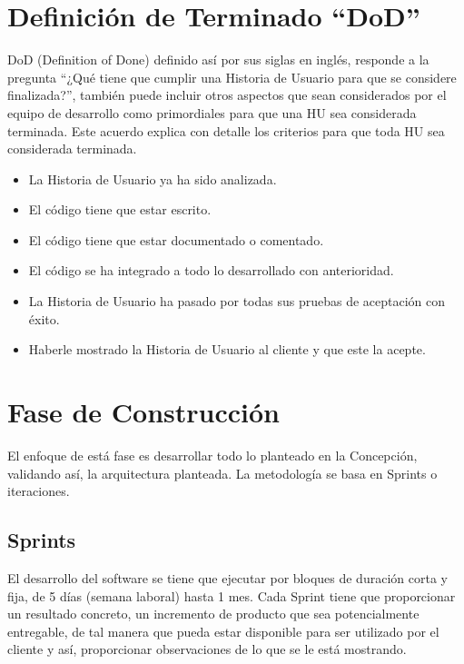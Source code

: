 \section*{Definición de Terminado “DoD”}

DoD (Definition of Done) definido así por sus siglas en inglés, responde a la pregunta “¿Qué tiene que cumplir una Historia de Usuario para que se considere finalizada?”, también puede incluir otros aspectos que sean considerados por el equipo de desarrollo como primordiales para que una HU sea considerada terminada. Este acuerdo explica con detalle los criterios para que toda HU sea considerada terminada.

\begin{itemize}
    \item La Historia de Usuario ya ha sido analizada.
    \item El código tiene que estar escrito.
    \item El código tiene que estar documentado o comentado.
    \item El código se ha integrado a todo lo desarrollado con anterioridad.
    \item La Historia de Usuario ha pasado por todas sus pruebas de aceptación con éxito.
    \item Haberle mostrado la Historia de Usuario al cliente y que este la acepte.
\end{itemize}


\section*{Fase de Construcción}

El enfoque de está fase es desarrollar todo lo planteado en la Concepción, validando así, la arquitectura planteada. La metodología se basa en Sprints o iteraciones.

\subsection*{Sprints}

El desarrollo del software se tiene que ejecutar por bloques de duración corta y fija, de 5 días (semana laboral) hasta 1 mes. Cada Sprint tiene que proporcionar un resultado concreto, un incremento de producto que sea potencialmente entregable, de tal manera que pueda estar disponible para ser utilizado por el cliente y así, proporcionar observaciones de lo que se le está mostrando. \\

